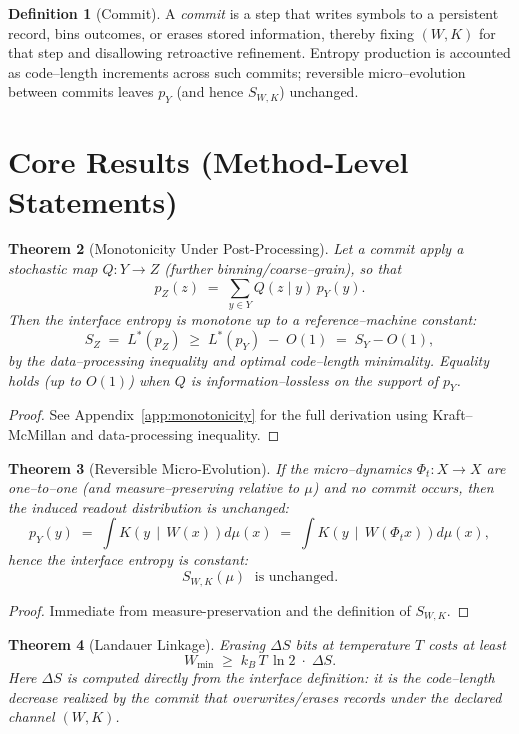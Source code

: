 \documentclass[11pt,letterpaper]{article}
\newtheorem{theorem}{Theorem}[section]
\theoremstyle{definition}
\newtheorem{definition}[theorem]{Definition}
\theoremstyle{remark}
\begin{document}
\begin{definition}[Commit]\label{def:commit}
A \emph{commit} is a step that writes symbols to a persistent record, bins outcomes, or erases stored information, thereby fixing \((W,K)\) for that step and disallowing retroactive refinement. Entropy production is accounted as code--length increments across such commits; reversible micro--evolution between commits leaves \(p_Y\) (and hence \(S_{W,K}\)) unchanged.
\end{definition}

\section{Core Results (Method-Level Statements)}

\begin{theorem}[Monotonicity Under Post-Processing]\label{thm:monotonicity}
Let a commit apply a stochastic map \(Q\!:\!Y\!\to\!Z\) (further binning/coarse--grain), so that
\[
p_Z(z)\;=\;\sum_{y\in Y} Q(z\mid y)\,p_Y(y).
\]
Then the interface entropy is monotone up to a reference--machine constant:
\[
S_Z \;=\; L^\ast(p_Z)\;\ge\;L^\ast(p_Y)\;-\;O(1)\;=\;S_Y - O(1),
\]
by the data--processing inequality and optimal code--length minimality. Equality holds (up to \(O(1)\)) when \(Q\) is information--lossless on the support of \(p_Y\).
\end{theorem}

\begin{proof}
See Appendix~\ref{app:monotonicity} for the full derivation using Kraft--McMillan and data-processing inequality.
\end{proof}

\begin{theorem}[Reversible Micro-Evolution]\label{thm:reversible}
If the micro--dynamics \(\Phi_t\!:\!X\!\to\!X\) are one--to--one (and measure--preserving relative to \(\mu\)) and no commit occurs, then the induced readout distribution is unchanged:
\[
p_Y(y)\;=\;\int K\!\left(y \,\middle|\, W(x)\right)d\mu(x)
\;=\;\int K\!\left(y \,\middle|\, W(\Phi_t x)\right)d\mu(x),
\]
hence the interface entropy is constant:
\[
S_{W,K}(\mu)\;\text{ is unchanged.}
\]
\end{theorem}

\begin{proof}
Immediate from measure-preservation and the definition of \(S_{W,K}\).
\end{proof}

\begin{theorem}[Landauer Linkage]\label{thm:landauer}
Erasing \(\Delta S\) bits at temperature \(T\) costs at least
\[
W_{\min}\;\ge\;k_B\,T\,\ln 2\;\cdot\;\Delta S.
\]
Here \(\Delta S\) is computed directly from the interface definition: it is the code--length \emph{decrease} realized by the commit that overwrites/erases records under the declared channel \((W,K)\).
\end{theorem}
\end{document}
